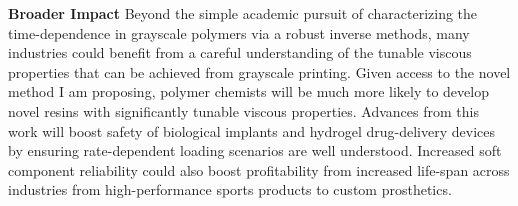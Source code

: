 \textbf{Broader Impact}
Beyond the simple academic pursuit of characterizing the time-dependence in grayscale polymers via a robust inverse methods, many industries could benefit from a careful understanding of the tunable viscous properties that can be achieved from grayscale printing. Given access to the novel method I am proposing, polymer chemists will be much more likely to develop novel resins with significantly tunable viscous properties. Advances from this work will boost safety of biological implants and hydrogel drug-delivery devices by ensuring rate-dependent loading scenarios are well understood. Increased soft component reliability could also boost profitability from increased life-span across industries from high-performance sports products to custom prosthetics. 